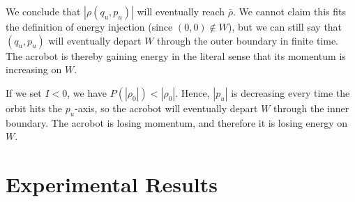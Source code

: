 We conclude that \(|\rho(q_u,p_u)|\) will eventually reach \(\bar{\rho}\). 
We cannot claim this fits the definition  of energy injection 
(since \((0,0) \notin W\)), but we can still say that \((q_u,p_u)\) will
eventually depart \(W\) through the outer boundary in finite time.
The acrobot is thereby gaining energy in the literal sense that its momentum
is increasing on \(W\).

If we set \(I < 0\), we have \(P(|\rho_0|) < |\rho_0|\).
Hence, \(|p_u|\) is decreasing every time the orbit hits the \(p_u\)-axis, so
the acrobot will eventually depart \(W\) through the inner boundary. 
The acrobot is losing momentum, and therefore it is losing energy on \(W\).


\section{Experimental Results}

